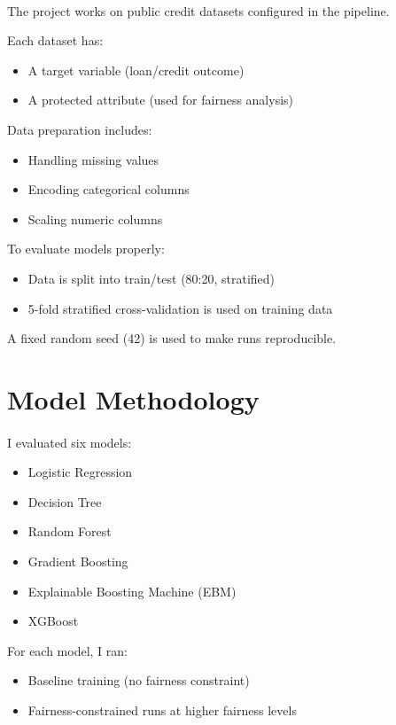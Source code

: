 \paragraph{}

The project works on public credit datasets configured in the pipeline.

Each dataset has:
\begin{itemize}
    \item A target variable (loan/credit outcome)
    \item A protected attribute (used for fairness analysis)
\end{itemize}

Data preparation includes:
\begin{itemize}
    \item Handling missing values
    \item Encoding categorical columns
    \item Scaling numeric columns
\end{itemize}

To evaluate models properly:
\begin{itemize}
    \item Data is split into train/test (80:20, stratified)
    \item 5-fold stratified cross-validation is used on training data
\end{itemize}

A fixed random seed (42) is used to make runs reproducible.

\section{Model Methodology}
\paragraph{}

I evaluated six models:
\begin{itemize}
    \item Logistic Regression
    \item Decision Tree
    \item Random Forest
    \item Gradient Boosting
    \item Explainable Boosting Machine (EBM)
    \item XGBoost
\end{itemize}

For each model, I ran:
\begin{itemize}
    \item Baseline training (no fairness constraint)
    \item Fairness-constrained runs at higher fairness levels
\end{itemize}


